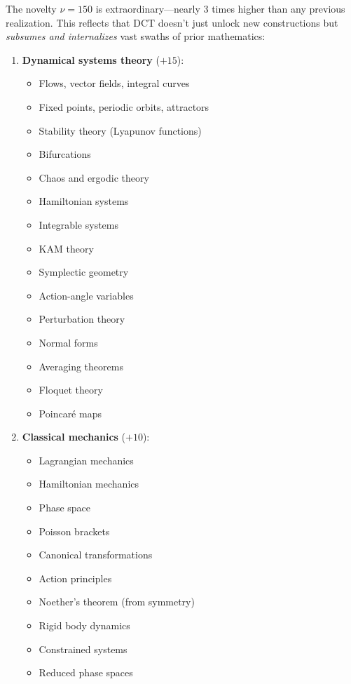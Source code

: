 \documentclass[11pt]{article}
\theoremstyle{definition}
\begin{document}
The novelty $\nu = 150$ is extraordinary—nearly 3 times higher than any previous realization. This reflects that DCT doesn't just unlock new constructions but \emph{subsumes and internalizes} vast swaths of prior mathematics:

\begin{enumerate}[leftmargin=*]
\item \textbf{Dynamical systems theory} ($+15$): 
\begin{itemize}
\item Flows, vector fields, integral curves
\item Fixed points, periodic orbits, attractors
\item Stability theory (Lyapunov functions)
\item Bifurcations
\item Chaos and ergodic theory
\item Hamiltonian systems
\item Integrable systems
\item KAM theory
\item Symplectic geometry
\item Action-angle variables
\item Perturbation theory
\item Normal forms
\item Averaging theorems
\item Floquet theory
\item Poincaré maps
\end{itemize}

\item \textbf{Classical mechanics} ($+10$):
\begin{itemize}
\item Lagrangian mechanics
\item Hamiltonian mechanics
\item Phase space
\item Poisson brackets
\item Canonical transformations
\item Action principles
\item Noether's theorem (from symmetry)
\item Rigid body dynamics
\item Constrained systems
\item Reduced phase spaces
\end{itemize}


\end{enumerate}
\end{document}
